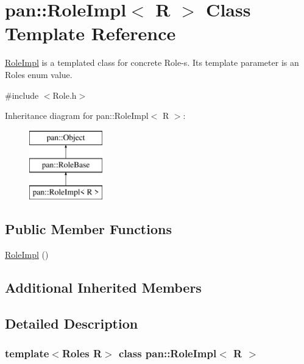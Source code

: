 \hypertarget{classpan_1_1_role_impl}{}\section{pan\+:\+:Role\+Impl$<$ R $>$ Class Template Reference}
\label{classpan_1_1_role_impl}


\hyperlink{classpan_1_1_role_impl}{Role\+Impl} is a templated class for concrete Role-\/s. Its template parameter is an Roles enum value.  




{\ttfamily \#include $<$Role.\+h$>$}

Inheritance diagram for pan\+:\+:Role\+Impl$<$ R $>$\+:\begin{figure}[H]
\begin{center}
\leavevmode
\includegraphics[height=3.000000cm]{classpan_1_1_role_impl}
\end{center}
\end{figure}
\subsection*{Public Member Functions}
\begin{DoxyCompactItemize}
\item 
\hyperlink{classpan_1_1_role_impl_aa747c97282c72f41398e99a6fbdb62ae}{Role\+Impl} ()
\end{DoxyCompactItemize}
\subsection*{Additional Inherited Members}


\subsection{Detailed Description}
\subsubsection*{template$<$Roles R$>$\newline
class pan\+::\+Role\+Impl$<$ R $>$}

